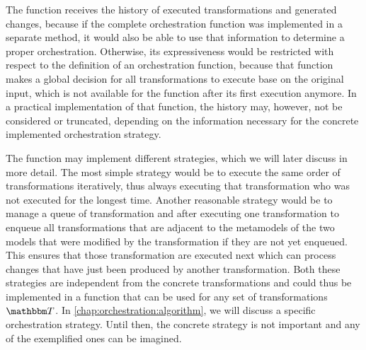 The function receives the history of executed transformations and generated changes, because if the complete orchestration function was implemented in a separate method, it would also be able to use that information to determine a proper orchestration.
Otherwise, its expressiveness would be restricted with respect to the definition of an orchestration function, because that function makes a global decision for all transformations to execute base on the original input, which is not available for the  function after its first execution anymore.
In a practical implementation of that function, the history may, however, not be considered or truncated, depending on the information necessary for the concrete implemented orchestration strategy.

The  function may implement different strategies, which we will later discuss in more detail.
The most simple strategy would be to execute the same order of transformations iteratively, thus always executing that transformation who was not executed for the longest time.
Another reasonable strategy would be to manage a queue of transformation and after executing one transformation to enqueue all transformations that are adjacent to the metamodels of the two models that were modified by the transformation if they are not yet enqueued.
This ensures that those transformation are executed next which can process changes that have just been produced by another transformation.
Both these strategies are independent from the concrete transformations and could thus be implemented in a function that can be used for any set of transformations $\transformationset{T}$.
In \autoref{chap:orchestration:algorithm}, we will discuss a specific orchestration strategy.
Until then, the concrete strategy is not important and any of the exemplified ones can be imagined.

